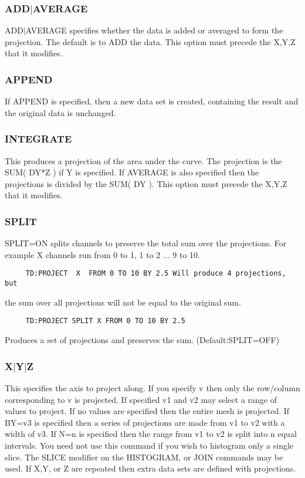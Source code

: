 \subsubsection{ADD$|$AVERAGE}
ADD$|$AVERAGE specifies whether the data is added or averaged to form the
projection.  The default is to ADD the data.  This option must  precede
the X,Y,Z that it modifies.  
\subsubsection{APPEND}
If  APPEND is specified, then a new data set is created, containing the
result and the original data is unchanged.  
\subsubsection{INTEGRATE}
This produces a projection of the area under the curve.  The projection
is the SUM( DY*Z ) if Y is specified.  If  AVERAGE  is  also  specified
then  the  projections  is  divided by the SUM( DY ).  This option must
precede the X,Y,Z that it modifies.  
\subsubsection{SPLIT}
SPLIT=ON   splits   channels   to  preserve  the  total  sum  over  the
projections.  For example X channels run from 0 to 1, 1 to 2 ...  9  to
10.  
\begin{verbatim}
     TD:PROJECT  X  FROM 0 TO 10 BY 2.5 Will produce 4 projections, but
\end{verbatim}
the sum over all projections will not be equal to the original sum.  
\begin{verbatim}
     TD:PROJECT SPLIT X FROM 0 TO 10 BY 2.5 
\end{verbatim}
Produces a set of projections and preserves the sum.  
(Default:SPLIT=OFF) 
\subsubsection{X$|$Y$|$Z}
This  specifies  the axis to project along.  If you specify v then only
the row/column corresponding to v is projected.  If specified v1 and v2
may  select  a  range of values to project.  If no values are specified
then the entire mesh is projected.  If BY=v3 is specified then a series
of  projections  are  made from v1 to v2 with a width of v3.  If N=n is
specified then the range from v1 to v2 is split into n equal intervals.
You  need  not  use this command if you wish to histogram only a single
slice.  The SLICE modifier on the HISTOGRAM, or JOIN  commands  may  be
used.   If X,Y, or Z are repeated then extra data sets are defined with
projections.  
